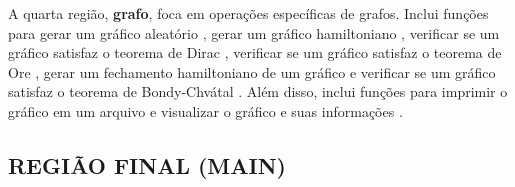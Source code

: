 \documentclass[12pt, openright, oneside, a4paper, chapter=TITLE, section=TITLE, subsection=TITLE, subsubsection=TITLE, brazil]{abntex2}
\begin{document}
A quarta região, \textbf{grafo}, foca em operações específicas de grafos. Inclui funções para gerar um gráfico aleatório , gerar um gráfico hamiltoniano , verificar se um gráfico satisfaz o teorema de Dirac , verificar se um gráfico satisfaz o teorema de Ore , gerar um fechamento hamiltoniano de um gráfico  e verificar se um gráfico satisfaz o teorema de Bondy-Chvátal . Além disso, inclui funções para imprimir o gráfico em um arquivo  e visualizar o gráfico e suas informações .

\subsection{REGIÃO FINAL (MAIN)}
\end{document}
